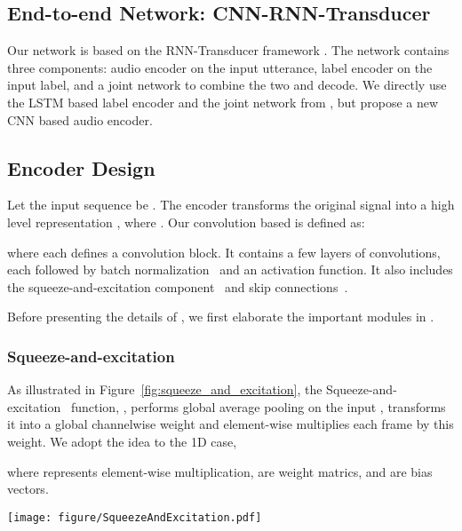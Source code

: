 \documentclass[a4paper]{article}
\begin{document}
\subsection{End-to-end Network: CNN-RNN-Transducer}
\label{sec:model:transducer}
\vspace{-0.02in}
Our network is based on the RNN-Transducer framework \cite{graves2012sequence, rao2017exploring, he2019}. The network contains three components: audio encoder on the input utterance, label encoder on the input label, and a joint network to combine the two and decode. We directly use the LSTM based label encoder and the joint network from \cite{he2019}, but propose a new CNN based audio encoder. 
\vspace{-0.05in}
\subsection{Encoder Design}
\vspace{-0.05in}
\label{sec:model:encoder}
Let the input sequence be . The encoder transforms the original signal  into a high level representation , where . Our convolution based  is defined as:

where each  defines a convolution block. It contains a few layers of convolutions, each followed by batch normalization~\cite{goodfellow2016deep} and an activation function. It also includes the squeeze-and-excitation component~\cite{hu2018squeeze} and skip connections~\cite{he2016deep}. 

Before presenting the details of , we first elaborate the important modules in .

\vspace{-0.05in}
\subsubsection{Squeeze-and-excitation}
\vspace{-0.05in}
As illustrated in Figure~\ref{fig:squeeze_and_excitation}, the Squeeze-and-excitation~\cite{hu2018squeeze} function, , performs global average pooling on the input , transforms it into a global channelwise weight  and element-wise multiplies each frame by this weight. We adopt the idea to the 1D case,
\begin{small}

\end{small}
where  represents element-wise multiplication,  are weight matrics, and  are bias vectors. 

\begin{figure*}
    \centering
    \texttt{[image: figure/SqueezeAndExcitation.pdf]}
    \caption{1D Squeeze-and-excitation module. The input first goes through a convolution layer followed by batch normalization and activation. Then average pooling is applied to condense the conv result into a 1D vector, which is then processed by a bottleneck structure formed by two fully connected (FC) layers with activation functions. The output goes through a Sigmoid function to be mapped to , and then tiled and applied on the conv output using pointwise multiplications.}
    \label{fig:squeeze_and_excitation}
\end{figure*}
\end{document}
